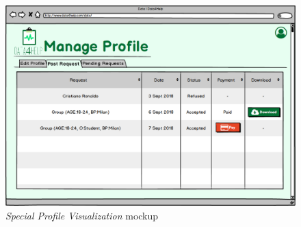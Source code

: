\begin{figure}
\begin{center}
  \includegraphics[width=\textwidth]{img/mockup/Searched.png}
  \hspace{0.05\linewidth}
  \centering
  \caption{\textit{Special Profile Visualization} mockup}
  \label{img:specialProfileVisualizationMockup}
\end{center}
\end{figure}
